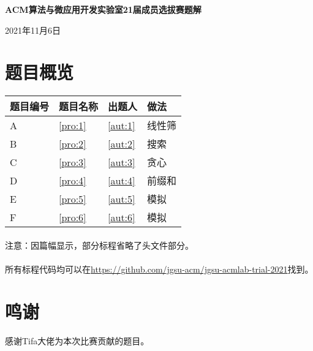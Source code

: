 \documentclass[
	lang=cn,
	color=blue
]{elegantbook}
\begin{document}
\begin{titlepage}
    \begin{center}
        \LARGE
        \textbf{ACM算法与微应用开发实验室21届成员选拔赛题解} \par
        \normalsize
        \vspace{0.5cm}
        2021年11月6日
    \end{center}

    \section*{题目概览}
    \begin{center}
        \begin{tabularx}{\textwidth}{M|M|M|M}
            \toprule
            \textbf{题目编号} & \textbf{题目名称} & \textbf{出题人} & \textbf{做法} \\
            \midrule
            A                 & \ref*{pro:1}      & \ref*{aut:1}    & 线性筛        \\
            B                 & \ref*{pro:2}      & \ref*{aut:2}    & 搜索          \\
            C                 & \ref*{pro:3}      & \ref*{aut:3}    & 贪心          \\
            D                 & \ref*{pro:4}      & \ref*{aut:4}    & 前缀和        \\
            E                 & \ref*{pro:5}      & \ref*{aut:5}    & 模拟          \\
            F                 & \ref*{pro:6}      & \ref*{aut:6}    & 模拟          \\
            \bottomrule
        \end{tabularx}
    \end{center}

    \paragraph*{} 注意：因篇幅显示，部分标程省略了头文件部分。
    \paragraph*{} 所有标程代码均可以在\url{https://github.com/jgsu-acm/jgsu-acmlab-trial-2021}找到。

    \section*{鸣谢}
    感谢Tifa大佬为本次比赛贡献的题目。

\end{titlepage}
\end{document}
